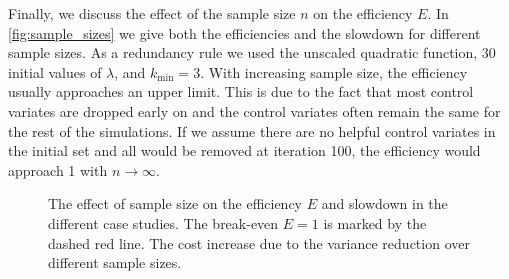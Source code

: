 Finally, we discuss the effect of the sample size $n$ on the efficiency $E$. In \autoref{fig:sample_sizes}
we give both the efficiencies and the slowdown for different sample sizes.
As a redundancy rule we used the unscaled quadratic function, 30 initial values of $\lambda$,
and $k_{\min}=3$. With increasing sample size, the efficiency usually approaches an upper limit.
This is due to the fact that most control  variates are dropped early on and
the control  variates often remain the same for the rest of the simulations.
If we assume there are no helpful control  variates in the initial set
and all would be removed at iteration 100, the efficiency would approach 1
with $n\to \infty$.
\begin{figure}
	\myfloatalign
	\quad
	\caption[Effect of sample size on control variate performance]{
    The effect of sample size on the efficiency $E$ and slowdown in the different case studies.
    The break-even $E=1$ is marked by the dashed red line.
    The cost increase due to the variance reduction over different sample sizes.}
    \label{fig:sample_sizes}
\end{figure}

